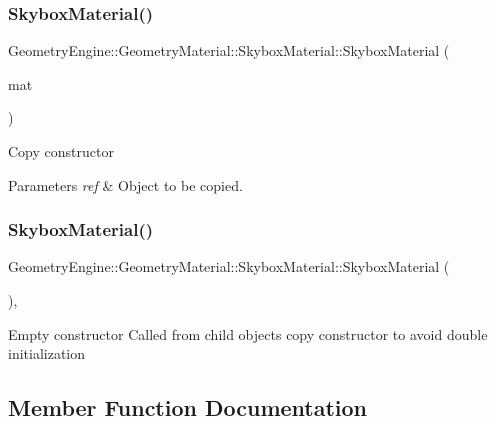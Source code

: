 \subsubsection{\texorpdfstring{SkyboxMaterial()}{SkyboxMaterial()}\hspace{0.1cm}{\footnotesize\ttfamily [2/3]}}
{\footnotesize\ttfamily Geometry\+Engine\+::\+Geometry\+Material\+::\+Skybox\+Material\+::\+Skybox\+Material (\begin{DoxyParamCaption}\item[{const \mbox{\hyperlink{class_geometry_engine_1_1_geometry_material_1_1_skybox_material}{Skybox\+Material}} \&}]{mat }\end{DoxyParamCaption})}

Copy constructor 
\begin{DoxyParams}{Parameters}
{\em ref} & Object to be copied. \\
\hline
\end{DoxyParams}
\mbox{\label{class_geometry_engine_1_1_geometry_material_1_1_skybox_material_ab2e9b5f4126857d70499480be0de286d}} 
\subsubsection{\texorpdfstring{SkyboxMaterial()}{SkyboxMaterial()}\hspace{0.1cm}{\footnotesize\ttfamily [3/3]}}
{\footnotesize\ttfamily Geometry\+Engine\+::\+Geometry\+Material\+::\+Skybox\+Material\+::\+Skybox\+Material (\begin{DoxyParamCaption}{ }\end{DoxyParamCaption})\hspace{0.3cm}{\ttfamily [inline]}, {\ttfamily [protected]}}

Empty constructor Called from child objects copy constructor to avoid double initialization 

\subsection{Member Function Documentation}
\mbox{\label{class_geometry_engine_1_1_geometry_material_1_1_skybox_material_ad1ec431a67d52440abfa24d66dbc12ca}} 
